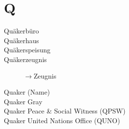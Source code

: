 \section*{Q}

\articlesize

\begin{description}

 \item[Quäkerbüro]

 \item[Quäkerhaus]

 \item[Quäkerspeisung]

 \item[Quäkerzeugnis] $\to$Zeugnis

 \item[Quaker (Name)]

 \item[Quaker Gray]

 \item[Quaker Peace \& Social Witness (QPSW)]

 \item[Quaker United Nations Office (QUNO)]

 \end{description}

\normalsize
